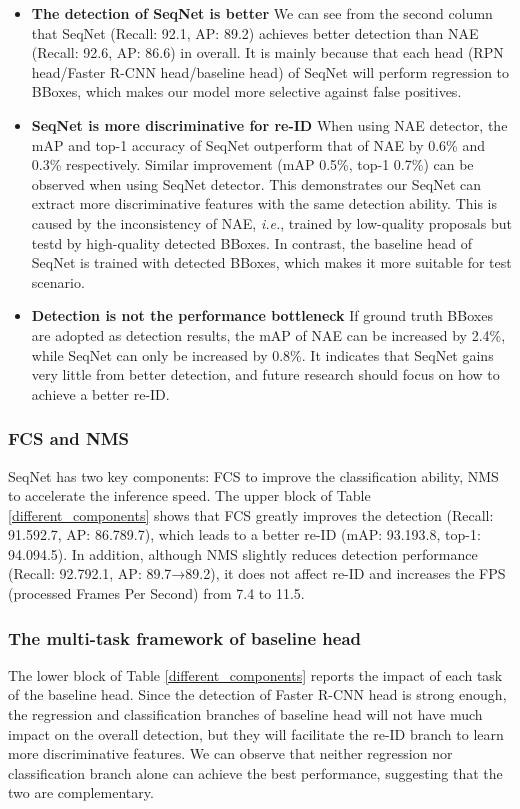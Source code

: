 \documentclass[letterpaper]{article} \usepackage{aaai21}  \usepackage{times}  \usepackage{helvet} \usepackage{courier}  \usepackage[hyphens]{url}  \usepackage{graphicx} \urlstyle{rm} \def\UrlFont{\rm}  \usepackage{natbib}  \usepackage{caption} \usepackage{multirow}
\begin{document}
\begin{itemize}
    \item \textbf{The detection of SeqNet is better} We can see from the second column that SeqNet (Recall: 92.1, AP: 89.2) achieves better detection than NAE (Recall: 92.6, AP: 86.6) in overall. It is mainly because that each head (RPN head/Faster R-CNN head/baseline head) of SeqNet will perform regression to BBoxes, which makes our model more selective against false positives.
    \item \textbf{SeqNet is more discriminative for re-ID} When using NAE detector, the mAP and top-1 accuracy of SeqNet outperform that of NAE by 0.6\% and 0.3\% respectively. Similar improvement (mAP  0.5\%, top-1  0.7\%) can be observed when using SeqNet detector. This demonstrates our SeqNet can extract more discriminative features with the same detection ability. This is caused by the inconsistency of NAE, \textit{i.e.}, trained by low-quality proposals but testd by high-quality detected BBoxes. In contrast, the baseline head of SeqNet is trained with detected BBoxes, which makes it more suitable for test scenario.
    \item \textbf{Detection is not the performance bottleneck} If ground truth BBoxes are adopted as detection results, the mAP of NAE can be increased by 2.4\%, while SeqNet can only be increased by 0.8\%. It indicates that SeqNet gains very little from better detection, and future research should focus on how to achieve a better re-ID.
\end{itemize}

\subsubsection{FCS and NMS}
SeqNet has two key components: FCS to improve the classification ability, NMS to accelerate the inference speed. The upper block of Table \ref{different_components} shows that FCS greatly improves the detection (Recall: 91.592.7, AP: 86.789.7), which leads to a better re-ID (mAP: 93.193.8, top-1: 94.094.5). In addition, although NMS slightly reduces detection performance (Recall: 92.792.1, AP: 89.7→89.2), it does not affect re-ID and increases the FPS (processed Frames Per Second) from 7.4 to 11.5.

\subsubsection{The multi-task framework of baseline head}
The lower block of Table \ref{different_components} reports the impact of each task of the baseline head. Since the detection of Faster R-CNN head is strong enough, the regression and classification branches of baseline head will not have much impact on the overall detection, but they will facilitate the re-ID branch to learn more discriminative features. We can observe that neither regression nor classification branch alone can achieve the best performance, suggesting that the two are complementary.
\end{document}
